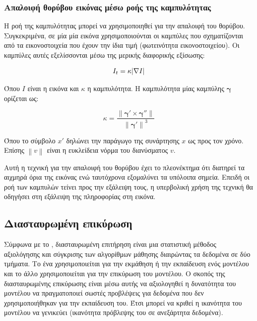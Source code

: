 \documentclass[a4paper,12pt]{article}
\DeclarePairedDelimiter\abs{\lvert}{\rvert}
\newcommand\norm[1]{\left\lVert#1\right\rVert}
\begin{document}
\subsubsection{Απαλοιφή θορύβου εικόνας μέσω ροής της καμπυλότητας}
\label{curvature_flow:1}

Η ροή της καμπυλότητας μπορεί να χρησιμοποιηθεί για την απαλοιφή του θορύβου.
Συγκεκριμένα, σε μία μία εικόνα χρησιμοποιούνται οι καμπύλες που σχηματίζονται
από τα εικονοστοιχεία που έχουν την ίδια τιμή (φωτεινότητα εικονοστοιχείου). Οι
καμπύλες αυτές εξελίσσονται \cite{curvature_flow:1} μέσω της μερικής διαφορικής
εξίσωσης:

\begin{equation} \label{eq:curvature_flow:1}
    I_t = \kappa \abs{\nabla I}
\end{equation}

Όπου $I$ είναι η εικόνα και $\kappa$ η καμπυλότητα. Η καμπυλότητα μίας καμπύλης
$\bm{\gamma}$ ορίζεται ως:

\begin{equation*}
    \kappa = \frac {\norm{\bm{\gamma}' \times \bm{\gamma}''}}
                   {\norm{\bm{\gamma}'}^3}
\end{equation*}

Όπου το σύμβολο $x'$ δηλώνει την παράγωγο της συνάρτησης $x$ ως προς τον χρόνο.
Επίσης $\norm{v}$ είναι η ευκλείδεια νόρμα του διανύσματος $v$.

Αυτή η τεχνική για την απαλοιφή του θορύβου έχει το πλεονέκτημα ότι διατηρεί
τα αιχμηρά όρια της εικόνας ενώ ταυτόχρονα εξομαλύνει τα υπόλοιπα σημεία. Επειδή
οι ροή των καμπυλών τείνει προς την εξάλειψη τους, η υπερβολική χρήση της
τεχνική θα οδηγήσει στη εξάλειψη της πληροφορίας στη εικόνα.

\subsection{Διασταυρωμένη επικύρωση}

Σύμφωνα με το \cite{cross_validation:1}, διασταυρωμένη επιτήρηση είναι μια
στατιστική μέθοδος αξιολόγησης και σύγκρισης των αλγορίθμων μάθησης διαιρώντας
τα δεδομένα σε δύο τμήματα. Το ένα χρησιμοποιείται για την εκμάθηση ή την
εκπαίδευση ενός μοντέλου και το άλλο χρησιμοποιείται για την επικύρωση του
μοντέλου. Ο σκοπός της διασταυρωμένης επικύρωσης είναι μέσω αυτής να αξιολογηθεί
η δυνατότητα του μοντέλου να πραγματοποιεί σωστές προβλέψεις για δεδομένα που
δεν χρησιμοποιήθηκαν για την εκπαίδευση του. Έτσι μπορεί να κριθεί η ικανότητα
του μοντέλου να γενικεύει (ικανότητα πρόβλεψης του σε ανεξάρτητα δεδομένα).
\end{document}
